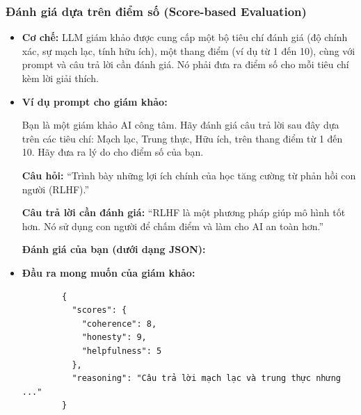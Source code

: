 \subsubsection{Đánh giá dựa trên điểm số (Score-based Evaluation)}
\begin{itemize}
    \item \textbf{Cơ chế:} LLM giám khảo được cung cấp một bộ tiêu chí đánh giá (độ chính xác, sự mạch lạc, tính hữu ích), một thang điểm (ví dụ từ 1 đến 10), cùng với prompt và câu trả lời cần đánh giá. Nó phải đưa ra điểm số cho mỗi tiêu chí kèm lời giải thích.
    \item \textbf{Ví dụ prompt cho giám khảo:}
        \begin{promptbox}
        Bạn là một giám khảo AI công tâm. Hãy đánh giá câu trả lời sau đây dựa trên các tiêu chí: Mạch lạc, Trung thực, Hữu ích, trên thang điểm từ 1 đến 10. Hãy đưa ra lý do cho điểm số của bạn.

        \textbf{Câu hỏi:} “Trình bày những lợi ích chính của học tăng cường từ phản hồi con người (RLHF).”

        \textbf{Câu trả lời cần đánh giá:} “RLHF là một phương pháp giúp mô hình tốt hơn. Nó sử dụng con người để chấm điểm và làm cho AI an toàn hơn.”

        \textbf{Đánh giá của bạn (dưới dạng JSON):}
        \end{promptbox}
    \item \textbf{Đầu ra mong muốn của giám khảo:}
        \begin{verbatim}
        {
          "scores": {
            "coherence": 8,
            "honesty": 9,
            "helpfulness": 5
          },
          "reasoning": "Câu trả lời mạch lạc và trung thực nhưng ..."
        }
        \end{verbatim}
\end{itemize}


